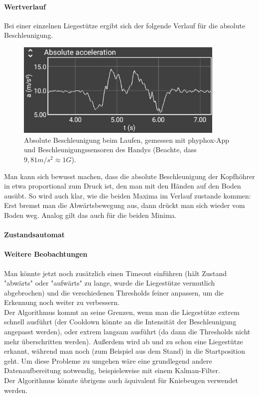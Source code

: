 \documentclass[a4paper,12pt]{article}
\begin{document}
\paragraph{Wertverlauf}
Bei einer einzelnen Liegestütze ergibt sich der folgende Verlauf für die absolute Beschleunigung.\\
\begin{figure}[h]
	\centering
\includegraphics[width = 10cm]{bilder/pushup_sample.jpg}
	\caption{Absolute Beschleunigung beim Laufen, gemessen mit phyphox-App und Beschleunigungssensoren des Handys (Beachte, dass $9,81 m/s^2 \approx 1 G$).}
\end{figure} 
Man kann sich bewusst machen, dass die absolute Beschleunigung der Kopfhöhrer in etwa proportional zum Druck ist, den man mit den Händen auf den Boden ausübt. So wird auch klar, wie die beiden Maxima im Verlauf zustande kommen: Erst bremst man die Abwärtsbewegung aus, dann drückt man sich wieder vom Boden weg. Analog gilt das auch für die beiden Minima. 
\paragraph{Zustandsautomat}


\paragraph{Weitere Beobachtungen}
Man könnte jetzt noch zusätzlich einen Timeout einführen (hält Zustand "abwärts" oder "aufwärts" zu lange, wurde die Liegestütze vermutlich abgebrochen) und die verschiedenen Thresholds feiner anpassen, um die Erkennung noch weiter zu verbessern.\\
Der Algorithmus kommt an seine Grenzen, wenn man die Liegestütze extrem schnell ausführt (der Cooldown könnte an die Intensität der Beschleunigung angepasst werden), oder extrem langsam ausführt (da dann die Thresholds nicht mehr überschritten werden). Außerdem wird ab und zu schon eine Liegestütze erkannt, während man noch (zum Beispiel aus dem Stand) in die Startposition geht. Um diese Probleme zu umgehen wäre eine grundlegend andere Datenaufbereitung notwendig, beispielsweise mit einem Kalman-Filter.\\
Der Algorithmus könnte übrigens auch äquivalent für Kniebeugen verwendet werden.
\end{document}
